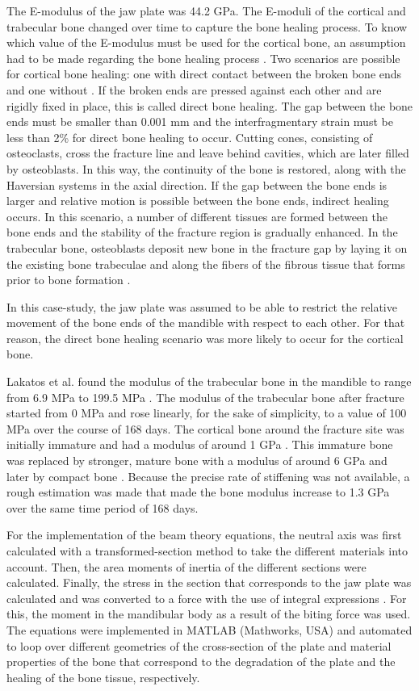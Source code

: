 The E-modulus of the jaw plate was 44.2 GPa. The E-moduli of the cortical and trabecular bone changed over time to capture the bone healing process. To know which value of the E-modulus must be used for the cortical bone, an assumption had to be made regarding the bone healing process \cite{Voss}. Two scenarios are possible for cortical bone healing: one with direct contact between the broken bone ends and one without \cite{Marsell}. If the broken ends are pressed against each other and are rigidly fixed in place, this is called direct bone healing. The gap between the bone ends must be smaller than 0.001 mm and the interfragmentary strain must be less than 2\% for direct bone healing to occur. Cutting cones, consisting of osteoclasts, cross the fracture line and leave behind cavities, which are later filled by osteoblasts. In this way, the continuity of the bone is restored, along with the Haversian systems in the axial direction. If the gap between the bone ends is larger and relative motion is possible between the bone ends, indirect healing occurs. In this scenario, a number of different tissues are formed between the bone ends and the stability of the fracture region is gradually enhanced. In the trabecular bone, osteoblasts deposit new bone in the fracture gap by laying it on the existing bone trabeculae and along the fibers of the fibrous tissue that forms prior to bone formation \cite{Voss}.

In this case-study, the jaw plate was assumed to be able to restrict the relative movement of the bone ends of the mandible with respect to each other. For that reason, the direct bone healing scenario was more likely to occur for the cortical bone.

Lakatos et al. found the modulus of the trabecular bone in the mandible to range from 6.9 MPa to 199.5 MPa \cite{Lakatos}. The modulus of the trabecular bone after fracture started from 0 MPa and rose linearly, for the sake of simplicity, to a value of 100 MPa over the course of 168 days. The cortical bone around the fracture site was initially immature and had a modulus of around 1 GPa \cite{Isaksson}. This immature bone was replaced by stronger, mature bone with a modulus of around 6 GPa and later by compact bone \cite{hawkeye}. Because the precise rate of stiffening was not available, a rough estimation was made that made the bone modulus increase to 1.3 GPa over the same time period of 168 days.

For the implementation of the beam theory equations, the neutral axis was first calculated with a transformed-section method to take the different materials into account. Then, the area moments of inertia of the different sections were calculated. Finally, the stress in the section that corresponds to the jaw plate was calculated and was converted to a force with the use of integral expressions \cite{beamtheory}. For this, the moment in the mandibular body as a result of the biting force was used. The equations were implemented in MATLAB (Mathworks, USA) and automated to loop over different geometries of the cross-section of the plate and material properties of the bone that correspond to the degradation of the plate and the healing of the bone tissue, respectively.


